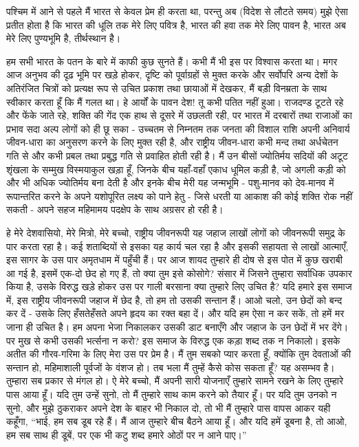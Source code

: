 
पश्चिम में आने से पहले मैं भारत से केवल प्रेम ही करता था, परन्तु अब (विदेश से लौटते समय) मुझे ऐसा प्रतीत होता है कि भारत की धूलि तक मेरे लिए पवित्र है, भारत की हवा तक मेरे लिए पावन है, भारत अब मेरे लिए पुण्यभूमि है, तीर्थस्थान है। 

हम सभी भारत के पतन के बारे में काफी कुछ सुनते हैं। कभी मैं भी इस पर विश्वास करता था। मगर आज अनुभव की दृढ़ भूमि पर खड़े होकर, दृष्टि को पूर्वाग्रहों से मुक्त करके और सर्वोपरि अन्य देशों के अतिरंजित चित्रों को प्रत्यक्ष रूप से उचित प्रकाश तथा छायाओं में देखकर, मैं बड़ी विनम्रता के साथ स्वीकार करता हूँ कि मैं गलत था। हे आर्यों के पावन देश! तू कभी पतित नहीं हुआ। राजदण्ड टूटते रहे और फेंके जाते रहे, शक्ति की गेंद एक हाथ से दूसरे में उछलती रही, पर भारत में दरबारों तथा राजाओं का प्रभाव सदा अल्प लोगों को ही छू सका - उच्चतम से निम्नतम तक जनता की विशाल राशि अपनी अनिवार्य जीवन-धारा का अनुसरण करने के लिए मुक्त रही है, और राष्ट्रीय जीवन-धारा कभी मन्द तथा अर्धचेतन गति से और कभी प्रबल तथा प्रबुद्ध गति से प्रवाहित होती रही है। मैं उन बीसों ज्योतिर्मय सदियों की अटूट शृंखला के सम्मुख विस्मयाकुल खड़ा हूँ, जिनके बीच यहाँ-वहाँ एकाध धूमिल कड़ी है, जो अगली कड़ी को और भी अधिक ज्योतिर्मय बना देती है और इनके बीच मेरी यह जन्मभूमि - पशु-मानव को देव-मानव में रूपान्तरित करने के अपने यशोपूरित लक्ष्य को पाने हेतु - जिसे धरती या आकाश की कोई शक्ति रोक नहीं सकती - अपने सहज महिमामय पदक्षेप के साथ अग्रसर हो रही है। 

हे मेरे देशवासियो, मेरे मित्रो, मेरे बच्चो, राष्ट्रीय जीवनरूपी यह जहाज लाखों लोगों को जीवनरूपी समुद्र के पार करता रहा है। कई शताब्दियों से इसका यह कार्य चल रहा है और इसकी सहायता से लाखों आत्माएँ, इस सागर के उस पार अमृतधाम में पहुँची हैं। पर आज शायद तुम्हारे ही दोष से इस पोत में कुछ खराबी आ गई है, इसमें एक-दो छेद हो गए हैं, तो क्या तुम इसे कोसोगे? संसार में जिसने तुम्हारा सर्वाधिक उपकार किया है, उसके विरुद्ध खड़े होकर उस पर गाली बरसाना क्या तुम्हारे लिए उचित है? यदि हमारे इस समाज में, इस राष्ट्रीय जीवनरूपी जहाज में छेद है, तो हम तो उसकी सन्तान हैं। आओ चलो, उन छेदों को बन्द कर दें - उसके लिए हँसतेहँसते अपने हृदय का रक्त बहा दें। और यदि हम ऐसा न कर सकें, तो हमें मर जाना ही उचित है। हम अपना भेजा निकालकर उसकी डाट बनाएँगे और जहाज के उन छेदों में भर देंगे। पर मुख से कभी उसकी भर्त्सना न करो? इस समाज के विरुद्ध एक कड़ा शब्द तक न निकालो। इसके अतीत की गौरव-गरिमा के लिए मेरा उस पर प्रेम है। मैं तुम सबको प्यार करता हूँ, क्योंकि तुम देवताओं की सन्तान हो, महिमाशाली पूर्वजों के वंशज हो। तब भला मैं तुम्हें कैसे कोस सकता हूँ? यह असम्भव है। तुम्हारा सब प्रकार से मंगल हो। ऐ मेरे बच्चो, मैं अपनी सारी योजनाएँ तुम्हारे सामने रखने के लिए तुम्हारे पास आया हूँ। यदि तुम उन्हें सुनो, तो मैं तुम्हारे साथ काम करने को तैयार हूँ। पर यदि तुम उनको न सुनो, और मुझे ठुकराकर अपने देश के बाहर भी निकाल दो, तो भी मैं तुम्हारे पास वापस आकर यही कहूँगा, “भाई, हम सब डूब रहे हैं। मैं आज तुम्हारे बीच बैठने आया हूँ। और यदि हमें डूबना है, तो आओ, हम सब साथ ही डूबें, पर एक भी कटु शब्द हमारे ओठों पर न आने पाए।”


